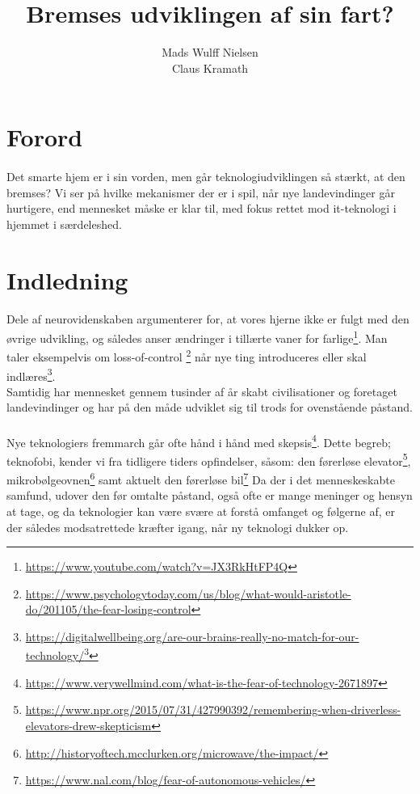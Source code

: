 \documentclass{article}
\title{%
Bremses udviklingen af sin fart?
}
\author{Mads Wulff Nielsen \\
Claus Kramath}
\begin{document}
\maketitle
\thispagestyle{empty}
\newpage
\tableofcontents
\thispagestyle{empty} 
\newpage
\section{Forord}
\paragraph{}
Det smarte hjem er i sin vorden, men går teknologiudviklingen så
stærkt, at den bremses? Vi ser på hvilke mekanismer der er i spil, når nye
landevindinger går hurtigere, end mennesket måske er klar til, med fokus
rettet mod it-teknologi i hjemmet i særdeleshed.
\section{Indledning}
\paragraph{}
Dele af neurovidenskaben argumenterer for, at vores hjerne ikke er fulgt med den øvrige udvikling,
og således anser ændringer i tillærte vaner for farlige\footnote{\url{https://www.youtube.com/watch?v=JX3RkHtFP4Q}}. Man taler eksempelvis om loss-of-control 
\footnote{\url{https://www.psychologytoday.com/us/blog/what-would-aristotle-do/201105/the-fear-losing-control}} når nye ting introduceres eller skal indlæres\footnote{\url{https://digitalwellbeing.org/are-our-brains-really-no-match-for-our-technology/}\footnote{https://www.youtube.com/watch?v=JX3RkHtFP4Q}}. \\
Samtidig har mennesket gennem tusinder af år skabt civilisationer og foretaget landevindinger og har på den måde udviklet sig til trods for ovenstående påstand.
\paragraph{}
Nye teknologiers fremmarch går ofte hånd i hånd med skepsis\footnote{\url{https://www.verywellmind.com/what-is-the-fear-of-technology-2671897}}.
Dette begreb; teknofobi, kender vi fra tidligere tiders opfindelser, såsom: den førerløse elevator\footnote{\url{https://www.npr.org/2015/07/31/427990392/remembering-when-driverless-elevators-drew-skepticism}}, mikrobølgeovnen\footnote{\url{http://historyoftech.mcclurken.org/microwave/the-impact/}}
samt aktuelt den førerløse bil\footnote{\url{https://www.nal.com/blog/fear-of-autonomous-vehicles/}}
Da der i det menneskeskabte samfund, udover den før omtalte påstand, også ofte er mange meninger og hensyn at tage, og da teknologier kan være svære at forstå omfanget og følgerne af, er der således modsatrettede kræfter igang, når ny teknologi dukker op.
\end{document}
